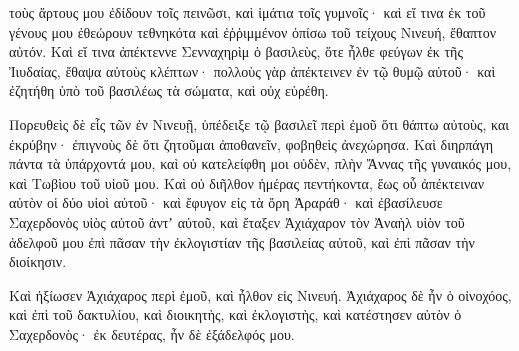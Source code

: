 {τοὺς ἄρτους μου ἐδίδουν τοῖς πεινῶσι, καὶ ἱμάτια τοῖς γυμνοῖς· καὶ εἴ τινα ἐκ τοῦ γένους μου ἐθεώρουν τεθνηκότα καὶ ἐῤῥιμμένον ὀπίσω τοῦ τείχους Νινευή, ἔθαπτον αὐτόν.
Καὶ εἴ τινα ἀπέκτεννε Σενναχηρὶμ ὁ βασιλεὺς, ὅτε ἦλθε φεύγων ἐκ τῆς Ἰιυδαίας, ἔθαψα αὐτοὺς κλέπτων· πολλοὺς γὰρ ἀπέκτεινεν ἐν τῷ θυμῷ αὐτοῦ· καὶ ἐζητήθη ὑπὸ τοῦ βασιλέως τὰ σώματα, καὶ οὐχ εὑρέθη.
\par }{\PP {}Πορευθεὶς δὲ εἷς τῶν ἐν Νινευῇ, ὑπέδειξε τῷ βασιλεῖ περὶ ἐμοῦ ὅτι θάπτω αὐτοὺς, και ἐκρύβην· ἐπιγνοὺς δὲ ὅτι ζητοῦμαι ἀποθανεῖν, φοβηθεὶς ἀνεχώρησα.
Καὶ διηρπάγη πάντα τὰ ὑπάρχοντά μου, καὶ οὐ κατελείφθη μοι οὐδὲν, πλὴν Ἄννας τῆς γυναικός μου, καὶ Τωβὶου τοῦ υἱοῦ μου.
Καὶ οὐ διῆλθον ἡμέρας πεντήκοντα, ἕως οὗ ἀπέκτειναν αὐτὸν οἱ δύο υἱοὶ αὐτοῦ· καὶ ἔφυγον εἰς τὰ ὄρη Ἀραράθ· καὶ ἐβασίλευσε Σαχερδονὸς υἱὸς αὐτοῦ ἀντʼ αὐτοῦ, καὶ ἔταξεν Ἀχιάχαρον τὸν Ἀναὴλ υἱὸν τοῦ ἀδελφοῦ μου ἐπὶ πᾶσαν τὴν ἐκλογιστίαν τῆς βασιλείας αὐτοῦ, καὶ ἐπὶ πᾶσαν τὴν διοίκησιν.
\par }{\PP {}Καὶ ἠξίωσεν Ἀχιάχαρος περὶ ἐμοῦ, καὶ ἦλθον εἰς Νινευή. Ἀχιάχαρος δὲ ἦν ὁ οἰνοχόος, καὶ ἐπὶ τοῦ δακτυλίου, καὶ διοικητὴς, καὶ ἐκλογιστὴς, καὶ κατέστησεν αὐτὸν ὁ Σαχερδονὸς· ἐκ δευτέρας, ἦν δὲ ἐξάδελφός μου.

}
